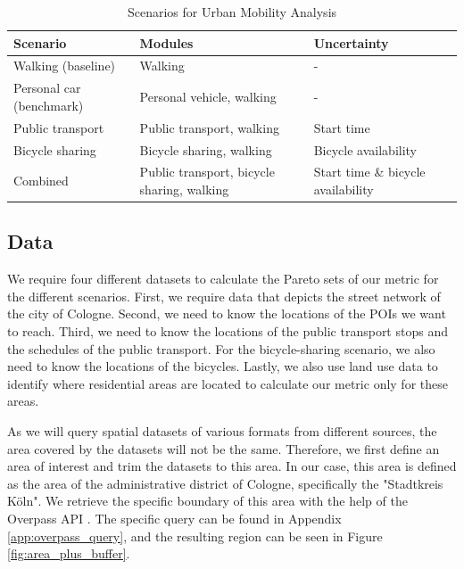 \begin{table}[h]
\centering
\begin{tabular}{|p{4cm}|p{5cm}|p{4cm}|}
\hline
\textbf{Scenario} & \textbf{Modules} & \textbf{Uncertainty} \\
\hline
Walking (baseline) & Walking & - \\
\hline
Personal car (benchmark) & Personal vehicle, walking & - \\
\hline
Public transport & Public transport, walking & Start time \\
\hline
Bicycle sharing & Bicycle sharing, walking & Bicycle availability \\
\hline
Combined & Public transport, bicycle sharing, walking & Start time \& bicycle availability \\
\hline
\end{tabular}
\caption{Scenarios for Urban Mobility Analysis}
\label{table:scenarios}
\end{table}


\subsection{Data}
\label{subs:data}

We require four different datasets to calculate the Pareto sets of our metric for the different scenarios.
First, we require data that depicts the street network of the city of Cologne.
Second, we need to know the locations of the POIs we want to reach.
Third, we need to know the locations of the public transport stops and the schedules of the public transport.
For the bicycle-sharing scenario, we also need to know the locations of the bicycles.
Lastly, we also use land use data to identify where residential areas are located to calculate our metric only for these areas.

As we will query spatial datasets of various formats from different sources, the area covered by the datasets will not be the same.
Therefore, we first define an area of interest and trim the datasets to this area.
In our case, this area is defined as the area of the administrative district of Cologne, specifically the "Stadtkreis Köln".
We retrieve the specific boundary of this area with the help of the Overpass API .
The specific query can be found in Appendix \ref{app:overpass_query}, and the resulting region can be seen in Figure \ref{fig:area_plus_buffer}.

